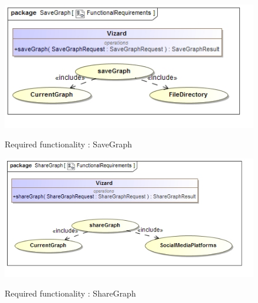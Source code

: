 \documentclass[a4paper,12pt]{article}
\begin{document}
	\begin{figure}[H]
		\includegraphics[width=\textwidth]{Images/uc__SaveGraph}  \\
		\caption{Required functionality : SaveGraph}
	\end{figure}
	
	\begin{figure}[H]
		\includegraphics[width=\textwidth]{Images/uc__ShareGraph}  \\
		\caption{Required functionality : ShareGraph}
	\end{figure}






\newpage
\end{document}

